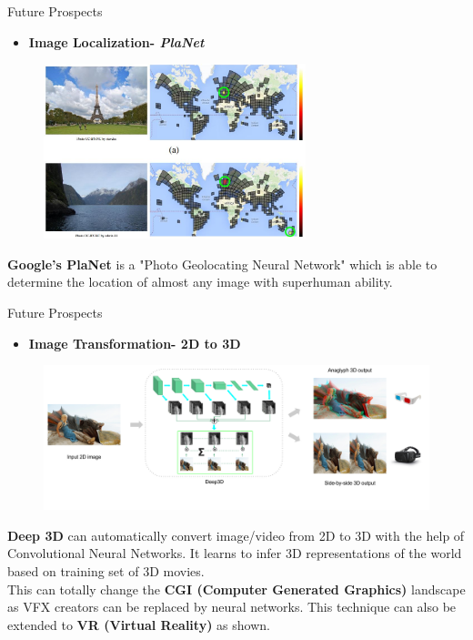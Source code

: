 \documentclass[10pt]{beamer}
\begin{document}
	\begin{frame}[c]{Future Prospects}
		\begin{itemize}
			\item \large{\textbf{Image Localization- \textit{PlaNet}}}
		\end{itemize}
		\begin{figure}
			\includegraphics[width=3in, height=2in]{images/planet}
		\end{figure}
		\textbf{Google's PlaNet} is a "Photo Geolocating Neural Network" which is able to \alert{determine the location of almost any image} with superhuman ability.
	\end{frame}
	\begin{frame}[c]{Future Prospects}
		\begin{itemize}
			\item \large{\textbf{Image Transformation- 2D to 3D}}
		\end{itemize}
		\begin{figure}
			\includegraphics[width=\linewidth]{images/deep3d}
		\end{figure}
		\textbf{Deep 3D} \alert{can automatically convert image/video from 2D to 3D} with the help of Convolutional Neural Networks. It learns to infer 3D representations of the world based on training set of 3D movies.
		\\
		This can totally change the \textbf{CGI (Computer Generated Graphics)} landscape as VFX creators can be replaced by neural networks. This technique can also be extended to \textbf{VR (Virtual Reality)} as shown.
	\end{frame}
\end{document}
